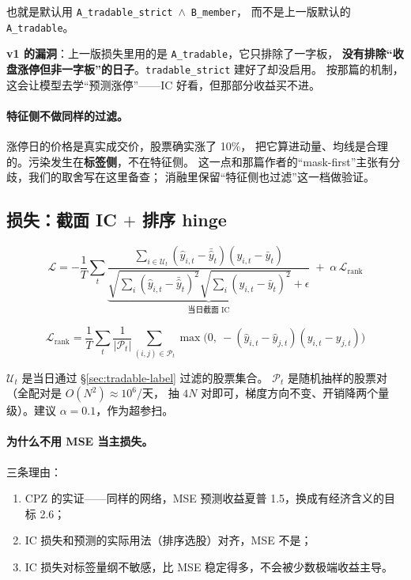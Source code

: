 \documentclass[11pt, a4paper]{ctexart}
\newcommand{\file}[1]{\texttt{\small #1}}
\begin{document}
也就是默认用 \file{A\_tradable\_strict}$\;\wedge\;$\file{B\_member}，
而不是上一版默认的 \file{A\_tradable}。

\begin{warnbox}
\textbf{v1 的漏洞}：上一版损失里用的是 \file{A\_tradable}，它只排除了一字板，
\textbf{没有排除“收盘涨停但非一字板”的日子}。\file{tradable\_strict} 建好了却没启用。
按那篇的机制，这会让模型去学“预测涨停”——IC 好看，但那部分收益买不进。
\end{warnbox}

\paragraph{特征侧不做同样的过滤。}涨停日的价格是真实成交价，股票确实涨了 10\%，
把它算进动量、均线是合理的。污染发生在\textbf{标签侧}，不在特征侧。
这一点和那篇作者的“mask-first”主张有分歧，我们的取舍写在这里备查；
消融里保留“特征侧也过滤”这一档做验证。

\subsection{损失：截面 IC $+$ 排序 hinge}

\begin{equation}
\mathcal{L} = -\frac{1}{T}\sum_{t}
\underbrace{\frac{\sum_{i\in\mathcal{U}_t}(\hat y_{i,t}-\bar{\hat y}_t)(y_{i,t}-\bar y_t)}
{\sqrt{\sum_i (\hat y_{i,t}-\bar{\hat y}_t)^2}\sqrt{\sum_i (y_{i,t}-\bar y_t)^2}+\epsilon}}_{\text{当日截面 IC}}
\;+\; \alpha\,\mathcal{L}_{\text{rank}}
\end{equation}

\begin{equation}
\mathcal{L}_{\text{rank}} = \frac{1}{T}\sum_t \frac{1}{|\mathcal{P}_t|}
\sum_{(i,j)\in\mathcal{P}_t} \max\bigl(0,\ -(\hat y_{i,t}-\hat y_{j,t})(y_{i,t}-y_{j,t})\bigr)
\end{equation}

$\mathcal{U}_t$ 是当日通过 \S\ref{sec:tradable-label} 过滤的股票集合。
$\mathcal{P}_t$ 是随机抽样的股票对（全配对是 $O(N^2)\approx 10^6$/天，
抽 $4N$ 对即可，梯度方向不变、开销降两个量级）。建议 $\alpha = 0.1$，作为超参扫。

\paragraph{为什么不用 MSE 当主损失。}三条理由：
\begin{enumerate}
  \item CPZ 的实证——同样的网络，MSE 预测收益夏普 1.5，换成有经济含义的目标 2.6；
  \item IC 损失和预测的实际用法（排序选股）对齐，MSE 不是；
  \item IC 损失对标签量纲不敏感，比 MSE 稳定得多，不会被少数极端收益主导。
\end{enumerate}
\end{document}
